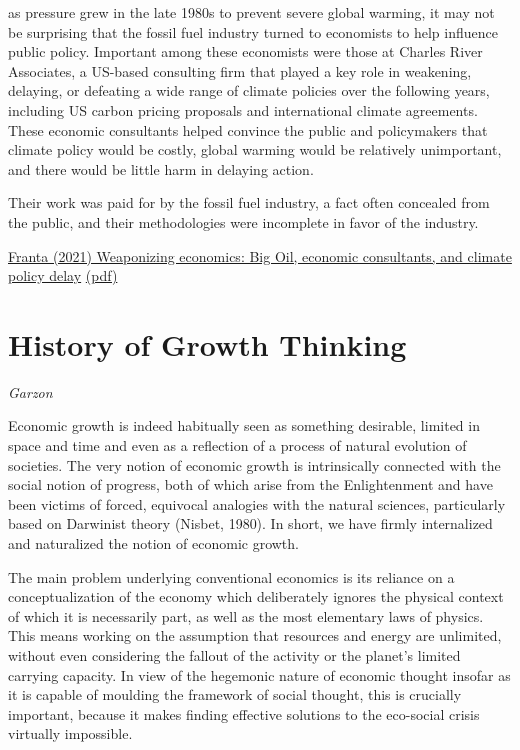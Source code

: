 \documentclass[
]{book}
\begin{document}
as pressure grew in the late 1980s to prevent severe global warming,
it may not be surprising that the fossil fuel industry turned to economists to
help influence public policy. Important among these economists were those
at Charles River Associates, a US-based consulting firm that played a key role
in weakening, delaying, or defeating a wide range of climate policies over the
following years, including US carbon pricing proposals and international
climate agreements. These economic consultants helped convince the public
and policymakers that climate policy would be costly, global warming would
be relatively unimportant, and there would be little harm in delaying action.

Their work was paid for by the fossil fuel industry, a fact often concealed
from the public, and their methodologies were incomplete in favor of the
industry.

\href{https://www.tandfonline.com/doi/full/10.1080/09644016.2021.1947636}{Franta (2021) Weaponizing economics: Big Oil, economic consultants,
and climate policy delay}
\href{pdf/Franta_2021_Weaponizing_Economics.pdf}{(pdf)}

\hypertarget{history-of-growth-thinking}{%
\section{History of Growth Thinking}\label{history-of-growth-thinking}}

\emph{Garzon}

Economic growth is indeed habitually seen as something desirable, limited in space and time and even as a reflection of a process of natural evolution of societies. The very notion of economic growth is intrinsically connected with the social notion of progress, both of which arise from the Enlightenment and have been victims of forced, equivocal analogies with the natural sciences, particularly based on Darwinist theory (Nisbet, 1980). In short, we have firmly internalized and naturalized the notion of economic growth.

The main problem underlying conventional economics is its reliance on a conceptualization of the economy which deliberately ignores the physical context of which it is necessarily part, as well as the most elementary laws of physics. This means working on the assumption that resources and energy are unlimited, without even considering the fallout of the activity or the planet's limited carrying capacity. In view of the hegemonic nature of economic thought insofar as it is capable of moulding the framework of social thought, this is crucially important, because it makes finding effective solutions to the eco-social crisis virtually impossible.
\end{document}
